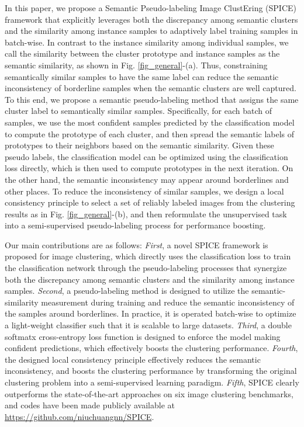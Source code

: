 \documentclass[10pt,twocolumn,letterpaper]{article}
\begin{document}
In this paper, we propose a Semantic Pseudo-labeling Image ClustEring (SPICE) framework that explicitly leverages both the discrepancy among semantic clusters and the similarity among instance samples to adaptively label training samples in batch-wise.
In contrast to the instance similarity among individual samples, we call the similarity between the cluster prototype and instance samples as the semantic similarity, as shown in Fig. \ref{fig_general}-(a).
Thus, constraining semantically similar samples to have the same label can reduce the semantic inconsistency of borderline samples when the semantic clusters are well captured.
To this end, we propose a semantic pseudo-labeling method that assigns the same cluster label to semantically similar samples.
Specifically, for each batch of samples, we use the most confident samples predicted by the classification model to compute the prototype of each cluster, and then spread the semantic labels of prototypes to their neighbors based on the semantic similarity.
Given these pseudo labels, the classification model can be optimized using the classification loss directly, which is then used to compute prototypes in the next iteration.
On the other hand, the semantic inconsistency may appear  around borderlines and other places. 
To reduce the inconsistency of similar samples, we design a local consistency principle to select a set of reliably labeled images from the clustering results as in Fig. \ref{fig_general}-(b), and then reformulate the unsupervised task into a semi-supervised pseudo-labeling process for performance boosting.

Our main contributions are as follows:
\emph{First}, a novel SPICE framework is proposed for image clustering, which directly uses the classification loss to train the classification network through the pseudo-labeling processes that synergize both the discrepancy among semantic clusters and the similarity among instance samples.
\emph{Second}, a pseudo-labeling method is designed to utilize the semantic-similarity measurement during training and reduce the semantic inconsistency of the samples around borderlines. In practice, it is operated batch-wise to optimize a light-weight classifier such that it is scalable to large datasets.
\emph{Third}, a double softmatx cross-entropy loss function is designed to enforce the model making confident predictions, which effectively boosts the clustering performance.
\emph{Fourth}, the designed local consistency principle effectively reduces the semantic inconsistency, and boosts the clustering performance by transforming the original clustering problem into a semi-supervised learning paradigm.
\emph{Fifth}, SPICE clearly outperforms the state-of-the-art approaches on six image clustering benchmarks, and codes have been made publicly available at \href{https://github.com/niuchuangnn/SPICE}{https://github.com/niuchuangnn/SPICE}.
\end{document}
